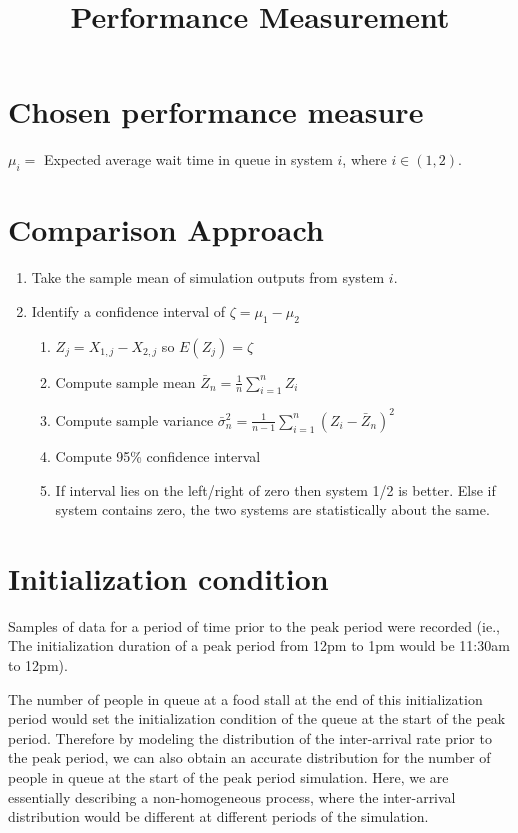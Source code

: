 \documentclass{article}
\begin{document}
\pagecolor{ultramarine}
\title{Performance Measurement}
\author{}
\date{}
\maketitle
\section{Chosen performance measure}
$\mu_i=$ Expected average wait time in queue in system $i$, where $i \in (1,2)$. 
\section{Comparison Approach}
\begin{enumerate}
\item Take the sample mean of simulation outputs from system $i$.
\item Identify a confidence interval of $\zeta=\mu_1-\mu_2$ \begin{enumerate}
\item $Z_j=X_{1,j}-X_{2,j}$ so $E(Z_j)=\zeta$
\item Compute sample mean $\bar Z_n = \frac{1}{n}\sum_{i=1}^n Z_i$
\item Compute sample variance $\bar{\sigma}_n^2=\frac{1}{n-1}\sum_{i=1}^n(Z_i-\bar Z_n)^2$
\item Compute 95\% confidence interval
\item If interval lies on the left/right of zero then system 1/2 is better. Else if system contains zero, the two systems are statistically about the same.
\end{enumerate}
\end{enumerate}
\section{Initialization condition}
Samples of data for a period of time prior to the peak period were recorded (ie., The initialization duration of a peak period from 12pm to 1pm would be 11:30am to 12pm). 

The number of people in queue at a food stall at the end of this initialization period would set the initialization condition of the queue at the start of the peak period. Therefore by modeling the distribution of the inter-arrival rate prior to the peak period, we can also obtain an accurate distribution for the number of people in queue at the start of the peak period simulation. Here, we are essentially describing a non-homogeneous process, where the inter-arrival distribution would be different at different periods of the simulation.
\end{document}
